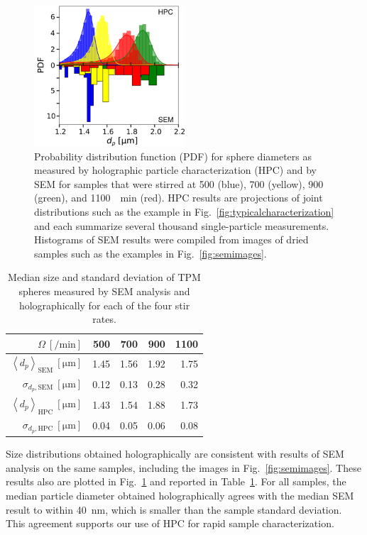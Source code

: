 \documentclass[journal=langd5,manuscript=article]{achemso}
\newcommand{\avg}[1]{\left< #1 \right>}
\begin{document}
\begin{figure}[!t]
  \centering
  \includegraphics[width=0.5\textwidth]{sizedistributions03}
  \caption{Probability distribution function (PDF) for 
    sphere diameters as measured by
    holographic particle characterization (HPC) and by SEM for
    samples that were stirred at 
    \num{500} (blue), 
    \num{700} (yellow), 
    \num{900} (green), 
    and \SI{1100}{\per\minute} (red).
    HPC results are projections of joint
    distributions such as the example in
    Fig.~\ref{fig:typicalcharacterization}
    and each summarize several thousand single-particle measurements.
    Histograms of SEM results were compiled from
    images of dried samples such as the
    examples in Fig.~\ref{fig:semimages}.}
  \label{fig:sizedistribution}
\end{figure}


\begin{table}[hb]
\centering
\caption{Median size and standard deviation of TPM spheres
  measured by SEM analysis 
  and holographically for each of the four stir rates.}
\begin{tabular}{rrrrr}
\hline
\hline
$\Omega~[\si{\per\minute}]$ & \num{500} & \num{700}& \num{900} & \num{1100} \\
\hline
$\avg{d_p}_{\text{SEM}}~[\si{\um}]$ & 1.45 & 1.56 & 1.92 & 1.75 \\ 
$\sigma_{d_p, \text{SEM}}~[\si{\um}]$ & 0.12 & 0.13 & 0.28 & 0.32 \\ 
$\avg{d_p}_{\text{HPC}}~[\si{\um}]$ & 1.43 & 1.54 & 1.88 & 1.73 \\ 
$\sigma_{d_p, \text{HPC}}~[\si{\um}]$ & 0.04 & 0.05 & 0.06 & 0.08 \\ 
\hline \hline
\end{tabular}
\label{table:sem_data}
\end{table}

Size distributions obtained holographically are consistent with results of SEM analysis on the same samples, including
the images in Fig.~\ref{fig:semimages}.
These results
also are plotted in Fig.~\ref{fig:sizedistribution}
and reported in Table~\ref{table:sem_data}.
For all samples, the median particle diameter
obtained holographically agrees with the median
SEM result to within \SI{40}{\nm}, which is smaller
than the sample standard deviation.
This agreement supports our use of HPC for rapid
sample characterization.
\end{document}
